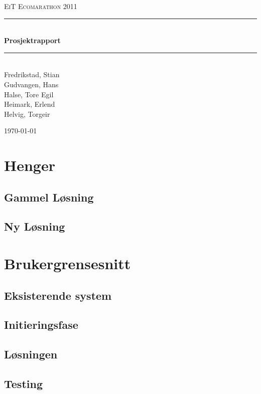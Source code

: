 \documentclass[a4paper,11pt]{report}
\newcommand{\HRule}{\rule{\linewidth}{0.5mm}}
\begin{document}
\begin{titlepage}

\begin{center}
\textsc{\LARGE EiT Ecomarathon 2011}\\[1.5cm]

\HRule \\[0.4cm]
{ \huge \bfseries Prosjektrapport}\\[0.4cm]
\HRule \\[1.5cm] 

Fredrikstad, Stian\\
Gudvangen, Hans\\
Halse, Tore Egil\\
Heimark, Erlend\\
Helvig, Torgeir\\

\vfill
 
{\large \today}

\end{center}
\end{titlepage}
\cleardoublepage
{}
\tableofcontents
\listoffigures
\listoftables
\clearpage
\chapter{Henger}
\section{Gammel Løsning}

\section{Ny Løsning}





\chapter{Brukergrensesnitt}
\section{Eksisterende system}

\newpage
\section{Initieringsfase}


\newpage
\section{Løsningen}

\section{Testing}

\appendix


\clearpage 
 
 
\end{document}
